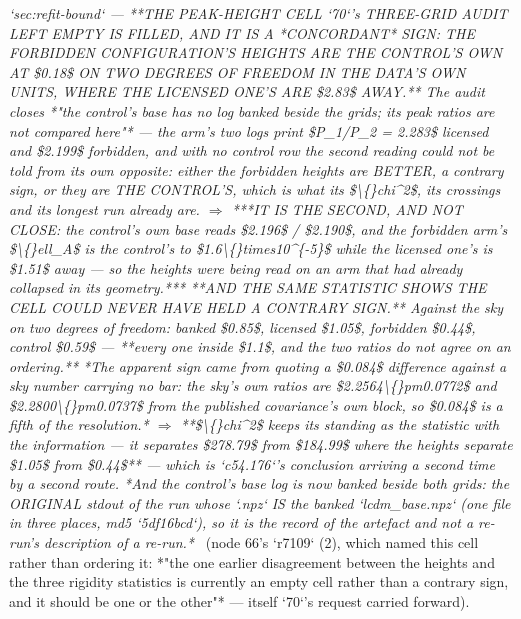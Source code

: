 \begin{description}
\textit{`sec:refit-bound` ---  **THE PEAK-HEIGHT CELL `70`'s THREE-GRID AUDIT LEFT EMPTY IS FILLED, AND IT IS A *CONCORDANT* SIGN: THE FORBIDDEN CONFIGURATION'S HEIGHTS ARE THE CONTROL'S OWN AT \$0.18\$ ON TWO DEGREES OF FREEDOM IN THE DATA'S OWN UNITS, WHERE THE LICENSED ONE'S ARE \$2.83\$ AWAY.** The audit closes *"the control's base has no log banked beside the grids; its peak ratios are not compared here"* --- the arm's two logs print \$P\_1/P\_2 = 2.283\$ licensed and \$2.199\$ forbidden, and with no control row the second reading could not be told from its own opposite: either the forbidden heights are BETTER, a contrary sign, or they are THE CONTROL'S, which is what its \$\textbackslash\{\}chi\textasciicircum{}2\$, its crossings and its longest run already are. \ensuremath{\Rightarrow} ***IT IS THE SECOND, AND NOT CLOSE: the control's own base reads \$2.196\$ / \$2.190\$, and the forbidden arm's \$\textbackslash\{\}ell\_A\$ is the control's to \$1.6\textbackslash\{\}times10\textasciicircum{}\{-5\}\$ while the licensed one's is \$1.51\$ away --- so the heights were being read on an arm that had already collapsed in its geometry.***  **AND THE SAME STATISTIC SHOWS THE CELL COULD NEVER HAVE HELD A CONTRARY SIGN.** Against the sky on two degrees of freedom: banked \$0.85\$, licensed \$1.05\$, forbidden \$0.44\$, control \$0.59\$ --- **every one inside \$1.1\$, and the two ratios do not agree on an ordering.** *The apparent sign came from quoting a \$0.084\$ difference against a sky number carrying no bar: the sky's own ratios are \$2.2564\textbackslash\{\}pm0.0772\$ and \$2.2800\textbackslash\{\}pm0.0737\$ from the published covariance's own block, so \$0.084\$ is a fifth of the resolution.* \ensuremath{\Rightarrow} **\$\textbackslash\{\}chi\textasciicircum{}2\$ keeps its standing as the statistic with the information --- it separates \$278.79\$ from \$184.99\$ where the heights separate \$1.05\$ from \$0.44\$** --- which is `c54.176`'s conclusion arriving a second time by a second route.  *And the control's base log is now banked beside both grids: the ORIGINAL stdout of the run whose `.npz` IS the banked `lcdm\_base.npz` (one file in three places, md5 `5df16bcd`), so it is the record of the artefact and not a re-run's description of a re-run.*} \ (node 66's `r7109` (2), which named this cell rather than ordering it: *"the one earlier disagreement between the heights and the three rigidity statistics is currently an empty cell rather than a contrary sign, and it should be one or the other"* --- itself `70`'s request carried forward). 

\end{description}
